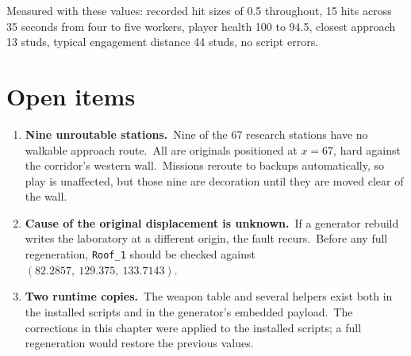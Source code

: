 Measured with these values: recorded hit sizes of 0.5 throughout, 15 hits across
35 seconds from four to five workers, player health 100 to 94.5, closest
approach 13 studs, typical engagement distance 44 studs, no script errors.\

\section{Open items}
\begin{enumerate}
\item \textbf{Nine unroutable stations.}\ Nine of the 67 research stations have
      no walkable approach route.\ All are originals positioned at $x=67$, hard
      against the corridor's western wall.\ Missions reroute to backups
      automatically, so play is unaffected, but those nine are decoration until
      they are moved clear of the wall.\
\item \textbf{Cause of the original displacement is unknown.}\ If a generator
      rebuild writes the laboratory at a different origin, the fault recurs.\
      Before any full regeneration, \texttt{Roof\_1} should be checked against
      $(82.2857,\ 129.375,\ 133.7143)$.\
\item \textbf{Two runtime copies.}\ The weapon table and several helpers exist
      both in the installed scripts and in the generator's embedded payload.\
      The corrections in this chapter were applied to the installed scripts; a
      full regeneration would restore the previous values.\
\end{enumerate}
